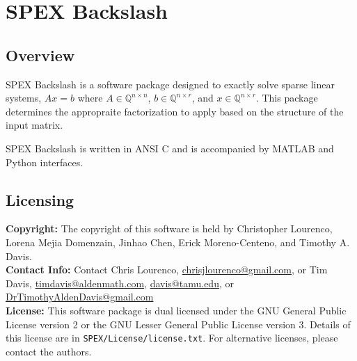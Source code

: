 \documentclass[12pt]{report}
\theoremstyle{definition}
\begin{document}
\chapter{SPEX Backslash} \label{ch:Backslash}

\section{Overview} \label{s:Backslash:intro}

SPEX Backslash is a software package designed to exactly solve sparse
linear systems, $A x = b$ where $A \in \mathbb{Q}^{n \times
n}$, $b \in \mathbb{Q}^{n \times r}$, and $x \in \mathbb{Q}^{n \times
r}$. This package determines the appropraite factorization to apply based on the
structure of the input matrix.

SPEX Backslash is written in ANSI C and is accompanied by MATLAB and Python interfaces.
 
\section{Licensing} \label{s:Backslash:licensing}

\textbf{Copyright:} The copyright of this software is held by  Christopher Lourenco, Lorena Mejia Domenzain, Jinhao Chen, Erick Moreno-Centeno, and Timothy A. Davis.\\

\noindent \textbf{Contact Info:} Contact Chris Lourenco,
\href{mailto:chrisjlourenco@gmail.com}{chrisjlourenco@gmail.com}, or Tim Davis,
\href{mailto:timdavis@aldenmath.com}{timdavis@aldenmath.com},
\href{mailto:davis@tamu.edu}{davis@tamu.edu}, or
\href{DrTimothyAldenDavis@gmail.com}{DrTimothyAldenDavis@gmail.com}\\

\noindent \textbf{License:} This software package is dual licensed under the GNU General Public License version 2 or the GNU Lesser General Public License version 3. Details of this license are in \verb|SPEX/License/license.txt|. For alternative licenses, please contact the authors.

\end{document}
